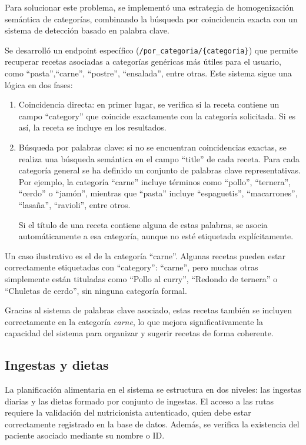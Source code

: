 Para solucionar este problema, se implementó una estrategia de homogenización semántica de categorías, combinando la búsqueda por coincidencia exacta con un sistema de detección basado en palabra clave.

Se desarrolló un endpoint específico (\texttt{/por\_categoria/\{categoria\}}) que permite recuperar recetas asociadas a categorías genéricas más útiles para el usuario, como ``pasta'',``carne'', ``postre'', ``ensalada'', entre otras. Este sistema sigue una lógica en dos fases:
\begin{enumerate}
  \item Coincidencia directa: en primer lugar, se verifica si la receta contiene un campo ``category'' que coincide exactamente con la categoría solicitada. Si es así, la receta se incluye en los resultados.

  \item Búsqueda por palabras clave: si no se encuentran coincidencias exactas, se realiza una búsqueda semántica en el campo ``title'' de cada receta. Para cada categoría general se ha definido un conjunto de palabras clave representativas. Por ejemplo, la categoría ``carne'' incluye términos como ``pollo'', ``ternera'', ``cerdo'' o ``jamón'', mientras que ``pasta'' incluye ``espaguetis'', ``macarrones'', ``lasaña'', ``ravioli'', entre otros.

  Si el título de una receta contiene alguna de estas palabras, se asocia automáticamente a esa categoría, aunque no esté etiquetada explícitamente.
\end{enumerate}

Un caso ilustrativo es el de la categoría ``carne''. Algunas recetas pueden estar correctamente etiquetadas con ``category'': ``carne'', pero muchas otras simplemente están tituladas como ``Pollo al curry'', ``Redondo de ternera'' o ``Chuletas de cerdo'', sin ninguna categoría formal.

Gracias al sistema de palabras clave asociado, estas recetas también se incluyen correctamente en la categoría \textit{carne}, lo que mejora significativamente la capacidad del sistema para organizar y sugerir recetas de forma coherente.

\subsection{Ingestas y dietas}
La planificación alimentaria en el sistema se estructura en dos niveles: las ingestas diarias y las dietas formado por conjunto de ingestas. El acceso a las rutas requiere la validación del nutricionista autenticado, quien debe estar correctamente registrado en la base de datos. Además, se verifica la existencia del paciente asociado mediante su nombre o ID.

